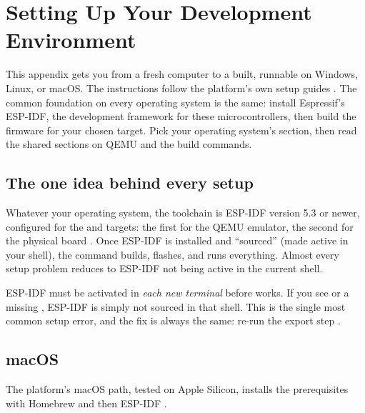 \chapter{Setting Up Your Development Environment}
\label{app:env}

This appendix gets you from a fresh computer to a built, runnable \prg on Windows,
Linux, or macOS. The instructions follow the platform's own setup guides
\citep{prg32repo}. The common foundation on every operating system is the same:
install Espressif's ESP-IDF, the development framework for these \riscv
microcontrollers, then build the firmware for your chosen target. Pick your
operating system's section, then read the shared sections on QEMU and the build
commands.

\section{The one idea behind every setup}

Whatever your operating system, the toolchain is ESP-IDF version 5.3 or newer,
configured for the  and  targets: the first for the
QEMU emulator, the second for the physical board \citep{prg32repo,prg32qemu}. Once
ESP-IDF is installed and ``sourced'' (made active in your shell), the command
 builds, flashes, and runs everything. Almost every setup problem
reduces to ESP-IDF not being active in the current shell.

\begin{prgwarn}
ESP-IDF must be activated in \emph{each new terminal} before  works.
If you see  or a missing ,
ESP-IDF is simply not sourced in that shell. This is the single most common
setup error, and the fix is always the same: re-run the export step
\citep{prg32repo}.
\end{prgwarn}

\section{macOS}

The platform's macOS path, tested on Apple Silicon, installs the prerequisites with
Homebrew and then ESP-IDF \citep{prg32repo}.




